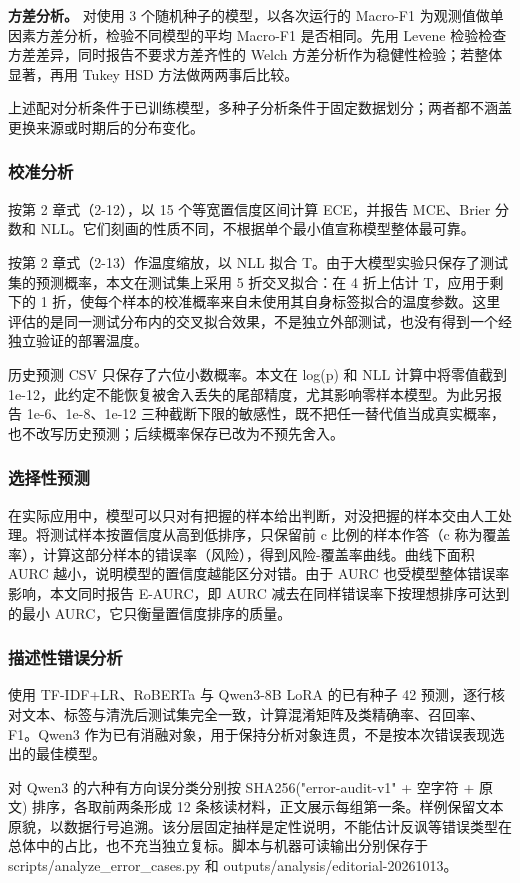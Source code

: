 \textbf{方差分析。} 对使用 3 个随机种子的模型，以各次运行的 Macro-F1 为观测值做单因素方差分析，检验不同模型的平均 Macro-F1 是否相同。先用 Levene 检验检查方差差异，同时报告不要求方差齐性的 Welch 方差分析作为稳健性检验；若整体显著，再用 Tukey HSD 方法做两两事后比较。

上述配对分析条件于已训练模型，多种子分析条件于固定数据划分；两者都不涵盖更换来源或时期后的分布变化。

\subsubsection{校准分析}

按第 2 章式（2-12），以 15 个等宽置信度区间计算 ECE，并报告 MCE、Brier 分数和 NLL\cite{ref22}。它们刻画的性质不同，不根据单个最小值宣称模型整体最可靠。

按第 2 章式（2-13）作温度缩放，以 NLL 拟合 T\cite{ref22}。由于大模型实验只保存了测试集的预测概率，本文在测试集上采用 5 折交叉拟合：在 4 折上估计 T，应用于剩下的 1 折，使每个样本的校准概率来自未使用其自身标签拟合的温度参数。这里评估的是同一测试分布内的交叉拟合效果，不是独立外部测试，也没有得到一个经独立验证的部署温度。

历史预测 CSV 只保存了六位小数概率。本文在 log(p) 和 NLL 计算中将零值截到 1e-12，此约定不能恢复被舍入丢失的尾部精度，尤其影响零样本模型。为此另报告 1e-6、1e-8、1e-12 三种截断下限的敏感性，既不把任一替代值当成真实概率，也不改写历史预测；后续概率保存已改为不预先舍入。

\subsubsection{选择性预测}

在实际应用中，模型可以只对有把握的样本给出判断，对没把握的样本交由人工处理。将测试样本按置信度从高到低排序，只保留前 c 比例的样本作答（c 称为覆盖率），计算这部分样本的错误率（风险），得到风险-覆盖率曲线。曲线下面积 AURC 越小，说明模型的置信度越能区分对错\cite{ref23}。由于 AURC 也受模型整体错误率影响，本文同时报告 E-AURC，即 AURC 减去在同样错误率下按理想排序可达到的最小 AURC，它只衡量置信度排序的质量。

\subsubsection{描述性错误分析}

使用 TF-IDF+LR、RoBERTa 与 Qwen3-8B LoRA 的已有种子 42 预测，逐行核对文本、标签与清洗后测试集完全一致，计算混淆矩阵及类精确率、召回率、F1。Qwen3 作为已有消融对象，用于保持分析对象连贯，不是按本次错误表现选出的最佳模型。

对 Qwen3 的六种有方向误分类分别按 SHA256("error-audit-v1" + 空字符 + 原文) 排序，各取前两条形成 12 条核读材料，正文展示每组第一条。样例保留文本原貌，以数据行号追溯。该分层固定抽样是定性说明，不能估计反讽等错误类型在总体中的占比，也不充当独立复标。脚本与机器可读输出分别保存于 scripts/analyze\_error\_cases.py 和 outputs/analysis/editorial-20261013。
